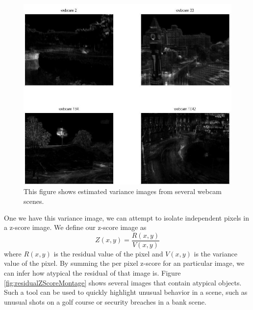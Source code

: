 \begin{figure}
	\centering
		\includegraphics[width=1\textwidth]{figures/severalVarianceImages.jpg}
	
	
		\caption[Several variance images.]{This figure shows estimated variance images from several webcam scenes.}
		\label{fig:severalVarianceImages}
\end{figure}

One we have this variance image, we can attempt to isolate independent pixels in a z-score image.  We define our z-score image as $$Z(x,y) = \frac{R(x,y)} { V(x,y)}$$ where $R(x,y)$ is the residual value of the pixel and $V(x,y)$ is the variance value of the pixel.  By summing the per pixel z-score for an particular image, we can infer how atypical the residual of that image is.  Figure \ref{fig:residualZScoreMontage} shows several images that contain atypical objects.  Such a tool can be used to quickly highlight unusual behavior in a scene, such as unusual shots on a golf course or security breaches in a bank scene.

